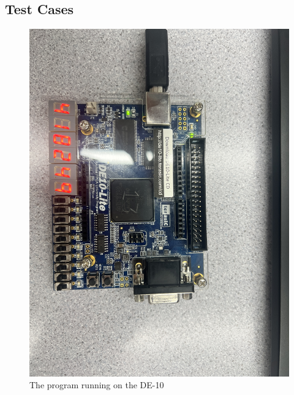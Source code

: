 \documentclass{article}
\begin{document}
\begin{flushleft}
  \section{Test Cases}
  \begin{figure}[!h]
    \begin{centering}
      \includegraphics[scale=0.2]{IMG_3756.jpeg}
      \caption{The program running on the DE-10}
    \end{centering}
  \end{figure}
  \begin{figure}[!h]
    \begin{centering}

\end{centering}
\end{figure}
\end{flushleft}
\end{document}
